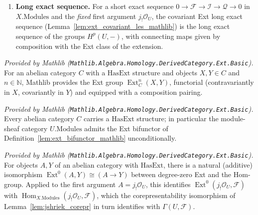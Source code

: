 \begin{definition}
\begin{enumerate}
    the second argument of \(\operatorname{Ext}^{n+1}(j_!\mathcal{O}_U, \mathcal{I})\),
    this yields \(H^{n+1}(U, \mathcal{I}) = 0\) directly: the short exact sequence stays
    in \(X.\mathrm{Modules}\), no restriction is taken, and
    restriction-preserves-injectives is not needed.
  \item \textbf{Long exact sequence.} For a short exact sequence \(0 \to \mathcal{F}
    \to \mathcal{I} \to \mathcal{Q} \to 0\) in \(X.\mathrm{Modules}\) and the
    \emph{fixed} first argument \(j_!\mathcal{O}_U\), the covariant Ext long exact
    sequence (Lemma~\ref{lem:ext_covariant_les_mathlib}) is the long exact sequence of
    the groups \(H^p(U, -)\), with connecting maps given by composition with the Ext
    class of the extension.
  \end{enumerate}
\end{definition}

\begin{definition}
  \label{lem:ext_bifunctor_mathlib}
  \mathlibok
  \textit{Provided by Mathlib
  (\texttt{Mathlib.Algebra.Homology.DerivedCategory.Ext.Basic}).}
  For an abelian category \(C\) with a \(\mathrm{HasExt}\) structure and objects \(X, Y
  \in C\) and \(n \in \mathbb{N}\), Mathlib provides the Ext group
  \(\operatorname{Ext}^n_C(X, Y)\), functorial (contravariantly in \(X\), covariantly in
  \(Y\)) and equipped with a composition pairing.
\end{definition}

\begin{lemma}
  \label{lem:hasext_standard_mathlib}
  \mathlibok
  \textit{Provided by Mathlib
  (\texttt{Mathlib.Algebra.Homology.DerivedCategory.Ext.Basic}).}
  Every abelian category \(C\) carries a \(\mathrm{HasExt}\) structure; in particular the
  module-sheaf category \(U.\mathrm{Modules}\) admits the Ext bifunctor of
  Definition~\ref{lem:ext_bifunctor_mathlib} unconditionally.
\end{lemma}

\begin{lemma}
  \label{lem:ext_homequiv_zero_mathlib}
  \mathlibok
  \textit{Provided by Mathlib
  (\texttt{Mathlib.Algebra.Homology.DerivedCategory.Ext.Basic}).}
  For objects \(A, Y\) of an abelian category with \(\mathrm{HasExt}\), there is a
  natural (additive) isomorphism \(\operatorname{Ext}^0(A, Y) \cong (A \to Y)\) between
  degree-zero Ext and the Hom-group. Applied to the first argument \(A =
  j_!\mathcal{O}_U\), this identifies \(\operatorname{Ext}^0(j_!\mathcal{O}_U,
  \mathcal{F})\) with
  \(\operatorname{Hom}_{X.\mathrm{Modules}}(j_!\mathcal{O}_U, \mathcal{F})\), which the
  corepresentability isomorphism of Lemma~\ref{lem:jshriek_corepr} in turn identifies
  with \(\Gamma(U, \mathcal{F})\).
\end{lemma}

